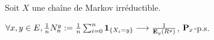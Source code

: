 Soit $X$ une chaîne de Markov irréductible.

\begin{thm}
	$\forall x,y \in E, \frac{1}{n} N_n^y := \frac{1}{n} \sum_{i = 0}^n \operatorname{\mathbf{1}}_{ \{ X_i = y \} } \longrightarrow \frac{1}{\mathbf{E}_y(R^y)}$, $\mathbf{P}_x$-p.s.
\end{thm}
